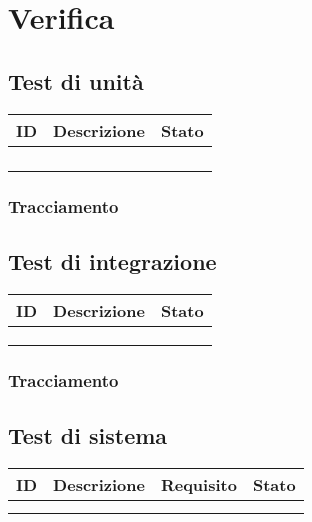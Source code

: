{{%
\newpage
\section{Verifica}


\subsection{Test di unità}
    {\renewcommand{\arraystretch}{1.5}
    \begin{tabularx}{\textwidth}{p{}|p{}|X}
    \textbf{ID} & \textbf{Descrizione} & \textbf{Stato}  \\
    \hline
     &  & \\
    \hline
     &  &  \\
    \hline
     &  & \\
    \hline
     &  &  \\
    \end{tabularx}}
    \subsubsection{Tracciamento}
    
\subsection{Test di integrazione}
    {\renewcommand{\arraystretch}{1.5}
    \begin{tabularx}{\textwidth}{p{}|p{}|X}
    \textbf{ID} & \textbf{Descrizione} & \textbf{Stato}  \\
    \hline
     &  & \\
    \hline
     &  &  \\
    \hline
     &  & \\
    \end{tabularx}}
    \subsubsection{Tracciamento}

\subsection{Test di sistema}
    {\renewcommand{\arraystretch}{1.5}
    \begin{tabularx}{\textwidth}{p{}|p{}|p{}|X}
    \textbf{ID} & \textbf{Descrizione} & \textbf{Requisito} & \textbf{Stato}  \\
    \hline
     &  & \\
    \hline
     &  &  \\
    \end{tabularx}}
}}
